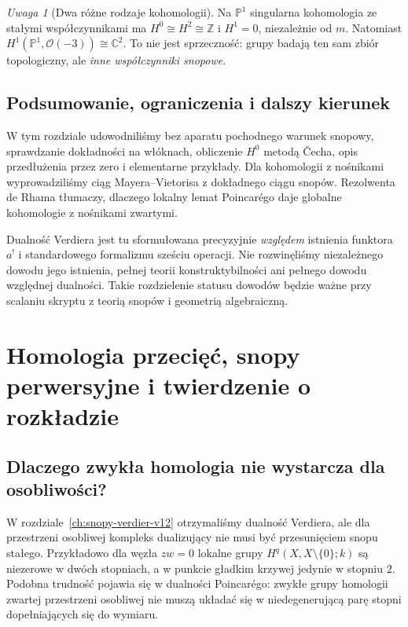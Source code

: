 \documentclass[11pt,a4paper,oneside]{report}
\newcommand{\C}{\mathbb{C}}
\newcommand{\Z}{\mathbb{Z}}
\theoremstyle{plain}
\theoremstyle{definition}
\theoremstyle{remark}
\newtheorem{uwaga}[twierdzenie]{Uwaga}
\begin{document}
\begin{uwaga}[Dwa różne rodzaje kohomologii]
Na $\mathbb P^1$ singularna kohomologia ze stałymi
współczynnikami ma $H^0\cong H^2\cong\Z$ i
$H^1=0$, niezależnie od $m$. Natomiast
$H^1(\mathbb P^1,\mathcal O(-3))\cong\C^2$.
To nie jest sprzeczność: grupy badają ten sam
zbiór topologiczny, ale \emph{inne współczynniki snopowe}.
\end{uwaga}


\section{Podsumowanie, ograniczenia i dalszy kierunek}
W tym rozdziale udowodniliśmy bez aparatu pochodnego
warunek snopowy, sprawdzanie dokładności na włóknach,
obliczenie $H^0$ metodą \v{C}echa, opis przedłużenia przez zero
i elementarne przykłady. Dla kohomologii z nośnikami
wyprowadziliśmy ciąg Mayera--Vietorisa z dokładnego
ciągu snopów. Rezolwenta de Rhama tłumaczy,
dlaczego lokalny lemat Poincarégo daje globalne
kohomologie z nośnikami zwartymi.

Dualność Verdiera jest tu sformułowana precyzyjnie
\emph{względem} istnienia funktora $a^!$
i standardowego formalizmu sześciu operacji.
Nie rozwinęliśmy niezależnego dowodu jego istnienia,
pełnej teorii konstruktybilności ani
pełnego dowodu względnej dualności. Takie rozdzielenie
statusu dowodów będzie ważne przy scalaniu skryptu
z teorią snopów i geometrią algebraiczną.


\chapter{Homologia przecięć, snopy perwersyjne i twierdzenie o rozkładzie}
\label{ch:ih-perverse-xiii}

\section{Dlaczego zwykła homologia nie wystarcza dla osobliwości?}
W rozdziale~\ref{ch:snopy-verdier-v12} otrzymaliśmy dualność Verdiera,
ale dla przestrzeni osobliwej kompleks dualizujący nie musi być
przesunięciem snopu stałego. Przykładowo dla węzła $zw=0$
lokalne grupy $H^q(X,X\setminus\{0\};k)$ są niezerowe w dwóch
stopniach, a w punkcie gładkim krzywej jedynie w stopniu $2$.
Podobna trudność pojawia się w dualności Poincarégo: zwykłe grupy
homologii zwartej przestrzeni osobliwej nie muszą układać się w
niedegenerującą parę stopni dopełniających się do wymiaru.
\end{document}
